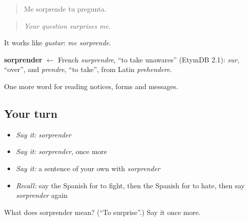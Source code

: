\begin{quote}
Me sorprende tu pregunta.
\end{quote}

\begin{quote}
\emph{Your question surprises me.}
\end{quote}

It works like \emph{gustar}: \emph{me sorprende}.

\begin{cousinweb}
\textbf{sorprender} $\leftarrow$ French \emph{surprendre}, \textquotedblleft{}to take unawares\textquotedblright{} (EtymDB 2.1): \emph{sur}, \textquotedblleft{}over\textquotedblright{}, and \emph{prendre}, \textquotedblleft{}to take\textquotedblright{}, from Latin \emph{prehendere}.
\end{cousinweb}

\begin{grammarlens}[title={What you've built}]
One more word for reading notices, forms and messages.
\end{grammarlens}

\subsection*{Your turn}
\begin{itemize}
\raggedright
  \item \emph{Say it:} \emph{sorprender}
  \item \emph{Say it:} \emph{sorprender}, once more
  \item \emph{Say it:} a sentence of your own with \emph{sorprender}
  \item \emph{Recall:} say the Spanish for to fight, then the Spanish for to hate, then say \emph{sorprender} again
\end{itemize}

\begin{tcolorbox}[breakable,colback=teal!4,colframe=teal!35!black,title={Before you move on}]
What does sorprender mean? (\textquotedblleft{}To surprise\textquotedblright{}.) Say it once more.
\end{tcolorbox}
